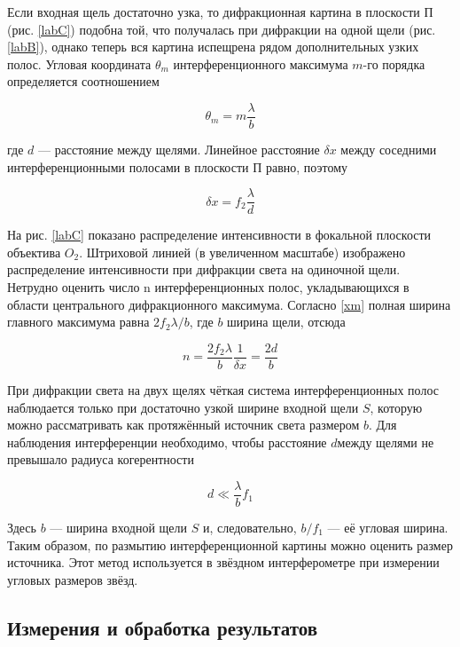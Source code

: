 \documentclass[a4paper,12pt]{article} %
\begin{document}
Если входная щель достаточно узка, то дифракционная картина
в плоскости П (рис. \ref{labC}) подобна той, что получалась при дифракции
на одной щели (рис. \ref{labB}), однако теперь вся картина испещрена рядом
дополнительных узких полос.
Угловая координата $ \theta_m $ интерференционного максимума $ m $-го порядка определяется соотношением

\begin{equation}\label{}
\theta_m = m \dfrac{\lambda}{b}
\end{equation}

где $ d $ --- расстояние между щелями. Линейное расстояние $ \delta x $ между соседними интерференционными полосами в плоскости П равно, поэтому

\begin{equation}\label{dx}
\delta x = f_2 \dfrac{\lambda}{d}
\end{equation}

На рис. \ref{labC} показано распределение интенсивности в фокальной плоскости объектива $ O_2 $. Штриховой линией (в увеличенном масштабе)
изображено распределение интенсивности при дифракции света на одиночной щели. Нетрудно оценить число n интерференционных полос,
укладывающихся в области центрального дифракционного максимума.
Согласно \eqref{xm} полная ширина главного максимума равна $ 2 f_2 \lambda /b $, где $ b $ ширина щели, отсюда

\begin{equation}\label{n}
n = \dfrac{2f_2 \lambda}{b} \dfrac{1}{\delta x} = \dfrac{2d}{b}
\end{equation}

При дифракции света на двух щелях чёткая система интерференционных полос наблюдается только при достаточно узкой ширине входной щели $ S $, которую можно рассматривать как протяжённый источник света размером $ b $. Для наблюдения интерференции необходимо, чтобы расстояние $ d $между щелями не превышало радиуса когерентности

\begin{equation}\label{}
d \ll \dfrac{\lambda}{b} f_1
\end{equation}

Здесь $ b $ --- ширина входной щели $ S $ и, следовательно, $  b/f_1 $ --- её угловая ширина. Таким образом, по размытию интерференционной картины можно оценить размер источника. Этот метод используется в звёздном интерферометре при измерении угловых размеров звёзд.

\subsection{Измерения и обработка результатов}
\end{document}
